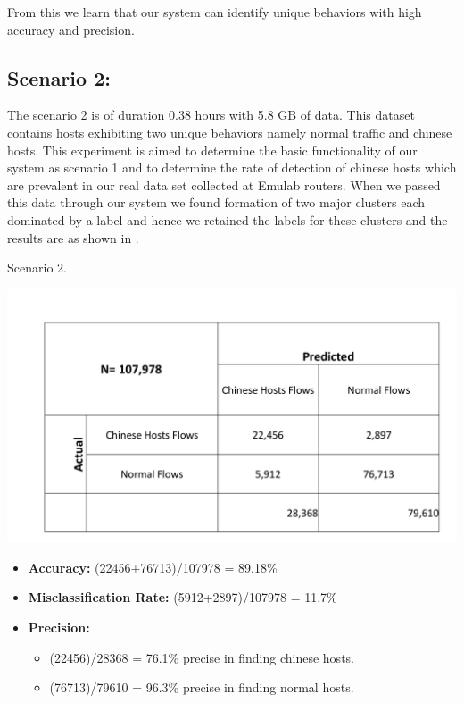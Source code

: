 From this we learn that our system can identify unique behaviors with high accuracy and precision.

\subsection{Scenario 2:}
The scenario 2 is of duration 0.38 hours with 5.8 GB of data. This dataset contains hosts exhibiting two unique behaviors namely normal traffic and chinese hosts. This experiment is aimed to determine the basic functionality of our system as scenario 1 and to determine the rate of detection of chinese hosts which are prevalent in our real data set collected at Emulab routers. When we passed this data through our system we found formation of two major clusters each dominated by a label and hence we retained the labels for these clusters and the results are as shown in .

\begin{table}[b]
	\caption{Scenario 2.}%
	\centerline{\includegraphics[scale = 0.5]{scenario2.pdf}}	
\end{table}

\begin{itemize}
	\item \textbf{Accuracy:}  (22456+76713)/107978 = 89.18\%
	
	\item \textbf{Misclassification Rate:} (5912+2897)/107978 = 11.7\%
	
	\item \textbf{Precision:} 
	\begin{itemize}	
	
		
		\item (22456)/28368 = 76.1\% precise in finding chinese hosts.
		
		\item (76713)/79610 = 96.3\% precise in finding normal hosts.
		
	\end{itemize}
	
\end{itemize}




